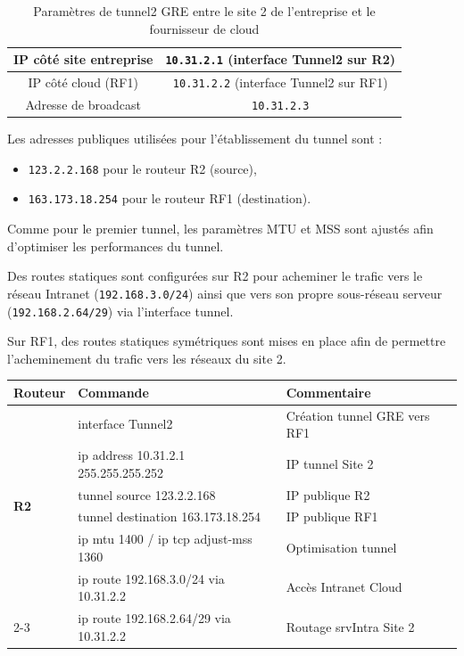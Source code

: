 \documentclass[12pt,a4paper, oneside]{memoir}
\begin{document}
\begin{enumerate}
\begin{table}[H]
\begin{tabular}{|c|c|}
		IP côté site entreprise  
		& \texttt{10.31.2.1} (interface Tunnel2 sur R2) \\
		\hline
		
		IP côté cloud (RF1) 
		& \texttt{10.31.2.2} (interface Tunnel2 sur RF1) \\
		\hline
		
		Adresse de broadcast 
		& \texttt{10.31.2.3} \\
		\hline
		
	\end{tabular}
	\caption{Paramètres de tunnel2 GRE entre le site 2 de l’entreprise et le fournisseur de cloud}
	\label{tab:gre_tunnel2}
\end{table}

Les adresses publiques utilisées pour l’établissement du tunnel sont :
\begin{itemize}
	\item \texttt{123.2.2.168} pour le routeur R2 (source),
	\item \texttt{163.173.18.254} pour le routeur RF1 (destination).
\end{itemize}

Comme pour le premier tunnel, les paramètres MTU et MSS sont ajustés afin d’optimiser les performances du tunnel.

Des routes statiques sont configurées sur R2 pour acheminer le trafic vers le réseau Intranet (\texttt{192.168.3.0/24}) ainsi que vers son propre sous-réseau serveur (\texttt{192.168.2.64/29}) via l’interface tunnel.

Sur RF1, des routes statiques symétriques sont mises en place afin de permettre l’acheminement du trafic vers les réseaux du site 2.


\begin{table}[H]
	\centering
	\renewcommand{\arraystretch}{1.3}
	\begin{tabular}{|p{2.5cm}|p{7cm}|p{6.5cm}|}
		\hline
		\textbf{Routeur} & \textbf{Commande} & \textbf{Commentaire} \\
		\hline		
		\multirow{6}{*}{\textbf{R2}} 
		& interface Tunnel2 & Création tunnel GRE vers RF1 \\
		& ip address 10.31.2.1 255.255.255.252 & IP tunnel Site 2 \\
		& tunnel source 123.2.2.168 & IP publique R2 \\
		& tunnel destination 163.173.18.254 & IP publique RF1 \\
		& ip mtu 1400 / ip tcp adjust-mss 1360 & Optimisation tunnel \\
		& ip route 192.168.3.0/24 via 10.31.2.2 & Accès Intranet Cloud \\
		\cline{2-3}
		& ip route 192.168.2.64/29 via 10.31.2.2 & Routage srvIntra Site 2 \\
		\hline
		

\end{tabular}
\end{table}
\end{enumerate}
\end{document}
